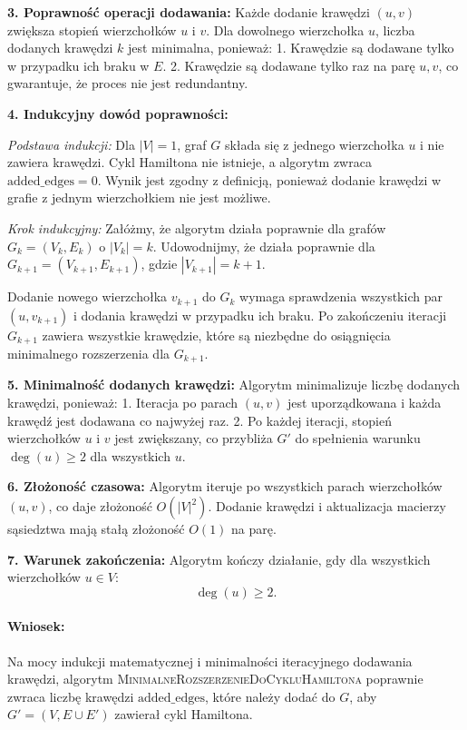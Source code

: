 \textbf{3. Poprawność operacji dodawania:}
Każde dodanie krawędzi \( (u, v) \) zwiększa stopień wierzchołków \( u \) i \( v \). Dla dowolnego wierzchołka \( u \), liczba dodanych krawędzi \( k \) jest minimalna, ponieważ:
1. Krawędzie są dodawane tylko w przypadku ich braku w \( E \).
2. Krawędzie są dodawane tylko raz na parę \( u, v \), co gwarantuje, że proces nie jest redundantny.

\textbf{4. Indukcyjny dowód poprawności:}

\textit{Podstawa indukcji:}  
Dla \( |V| = 1 \), graf \( G \) składa się z jednego wierzchołka \( u \) i nie zawiera krawędzi. Cykl Hamiltona nie istnieje, a algorytm zwraca \( \text{added\_edges} = 0 \). Wynik jest zgodny z definicją, ponieważ dodanie krawędzi w grafie z jednym wierzchołkiem nie jest możliwe.

\textit{Krok indukcyjny:}  
Załóżmy, że algorytm działa poprawnie dla grafów \( G_k = (V_k, E_k) \) o \( |V_k| = k \). Udowodnijmy, że działa poprawnie dla \( G_{k+1} = (V_{k+1}, E_{k+1}) \), gdzie \( |V_{k+1}| = k+1 \).

Dodanie nowego wierzchołka \( v_{k+1} \) do \( G_k \) wymaga sprawdzenia wszystkich par \( (u, v_{k+1}) \) i dodania krawędzi w przypadku ich braku. Po zakończeniu iteracji \( G_{k+1} \) zawiera wszystkie krawędzie, które są niezbędne do osiągnięcia minimalnego rozszerzenia dla \( G_{k+1} \).

\textbf{5. Minimalność dodanych krawędzi:}
Algorytm minimalizuje liczbę dodanych krawędzi, ponieważ:
1. Iteracja po parach \( (u, v) \) jest uporządkowana i każda krawędź jest dodawana co najwyżej raz.
2. Po każdej iteracji, stopień wierzchołków \( u \) i \( v \) jest zwiększany, co przybliża \( G' \) do spełnienia warunku \( \deg(u) \geq 2 \) dla wszystkich \( u \).

\textbf{6. Złożoność czasowa:}
Algorytm iteruje po wszystkich parach wierzchołków \( (u, v) \), co daje złożoność \( O(|V|^2) \). Dodanie krawędzi i aktualizacja macierzy sąsiedztwa mają stałą złożoność \( O(1) \) na parę.

\textbf{7. Warunek zakończenia:}
Algorytm kończy działanie, gdy dla wszystkich wierzchołków \( u \in V \):
\[
\deg(u) \geq 2.
\]

\paragraph{Wniosek:}
Na mocy indukcji matematycznej i minimalności iteracyjnego dodawania krawędzi, algorytm \textsc{MinimalneRozszerzenieDoCykluHamiltona} poprawnie zwraca liczbę krawędzi \( \text{added\_edges} \), które należy dodać do \( G \), aby \( G' = (V, E \cup E') \) zawierał cykl Hamiltona.


